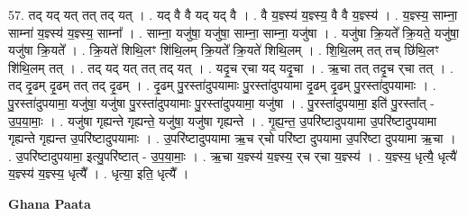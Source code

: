 \documentclass[17pt]{extarticle}
\begin{document}
57. तद् यद् यत् तत् तद् यत् । . यद् वै वै यद् यद् वै । . वै य॒ज्ञ्स्य॑ य॒ज्ञ्स्य॒ वै वै य॒ज्ञ्स्य॑ । . य॒ज्ञ्स्य॒ साम्ना॒ साम्ना॑ य॒ज्ञ्स्य॑ य॒ज्ञ्स्य॒ साम्ना᳚ । . साम्ना॒ यजु॑षा॒ यजु॑षा॒ साम्ना॒ साम्ना॒ यजु॑षा । . यजु॑षा क्रि॒यते᳚ क्रि॒यते॒ यजु॑षा॒ यजु॑षा क्रि॒यते᳚ । . क्रि॒यते॑ शिथि॒लꣳ शि॑थि॒लम् क्रि॒यते᳚ क्रि॒यते॑ शिथि॒लम् । . शि॒थि॒लम् तत् तच् छि॑थि॒लꣳ शि॑थि॒लम् तत् । . तद् यद् यत् तत् तद् यत् । . यदृ॒च र्‌चा यद् यदृ॒चा । . ऋ॒चा तत् तदृ॒च र्‌चा तत् । . तद् दृ॒ढम् दृ॒ढम् तत् तद् दृ॒ढम् । . दृ॒ढम् पु॒रस्ता॑दुपयामाः पु॒रस्ता॑दुपयामा दृ॒ढम् दृ॒ढम् पु॒रस्ता॑दुपयामाः । . पु॒रस्ता॑दुपयामा॒ यजु॑षा॒ यजु॑षा पु॒रस्ता॑दुपयामाः पु॒रस्ता॑दुपयामा॒ यजु॑षा । . पु॒रस्ता॑दुपयामा॒ इति॑ पु॒रस्ता᳚त् - उ॒प॒या॒माः॒ । . यजु॑षा गृह्यन्ते गृह्यन्ते॒ यजु॑षा॒ यजु॑षा गृह्यन्ते । . गृ॒ह्य॒न्त॒ उ॒परि॑ष्टादुपयामा उ॒परि॑ष्टादुपयामा गृह्यन्ते गृह्यन्त उ॒परि॑ष्टादुपयामाः । . उ॒परि॑ष्टादुपयामा ऋ॒च र्‌चो परि॑ष्टा दुपयामा उ॒परि॑ष्टा दुपयामा ऋ॒चा । . उ॒परि॑ष्टादुपयामा॒ इत्यु॒परि॑ष्टात् - उ॒प॒या॒माः॒ । . ऋ॒चा य॒ज्ञ्स्य॑ य॒ज्ञ्स्य॒ र्‌च र्‌चा य॒ज्ञ्स्य॑ । . य॒ज्ञ्स्य॒ धृत्यै॒ धृत्यै॑ य॒ज्ञ्स्य॑ य॒ज्ञ्स्य॒ धृत्यै᳚ । . धृत्या॒ इति॒ धृत्यै᳚ । \newline

\textbf{Ghana Paata } \newline
\end{document}
